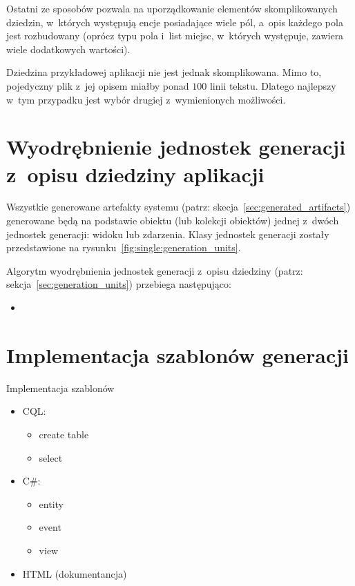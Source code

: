 


Ostatni ze sposobów pozwala na uporządkowanie elementów skomplikowanych dziedzin, w~których występują encje posiadające wiele pól, a~opis każdego pola jest rozbudowany (oprócz typu pola i~list miejsc, w~których występuje, zawiera wiele dodatkowych wartości).

Dziedzina przykładowej aplikacji nie jest jednak skomplikowana.
Mimo to, pojedyczny plik z~jej opisem miałby ponad $100$ linii tekstu.
Dlatego najlepszy w~tym przypadku jest wybór drugiej z~wymienionych możliwości.



\section{Wyodrębnienie jednostek generacji z~opisu dziedziny aplikacji} \label{sec:gen_units_extraction}

Wszystkie generowane artefakty systemu (patrz: skecja~\ref{sec:generated_artifacts}) generowane będą na podstawie obiektu (lub kolekcji obiektów) jednej z~dwóch jednostek generacji: widoku lub zdarzenia.
Klasy jednostek generacji zostały przedstawione na rysunku~\ref{fig:single:generation_units}.



Algorytm wyodrębnienia jednostek generacji z~opisu dziedziny (patrz: sekcja~\ref{sec:generation_units}) przebiega następująco:

\begin{itemize}
 \item 
\end{itemize}



\section{Implementacja szablonów generacji}

Implementacja szablonów

\begin{itemize}
 \item CQL:
  \begin{itemize}
   \item create table
   \item select
  \end{itemize}
 \item C\#:
  \begin{itemize}
   \item entity
   \item event
   \item view
  \end{itemize}
 \item HTML (dokumentancja)
\end{itemize}

